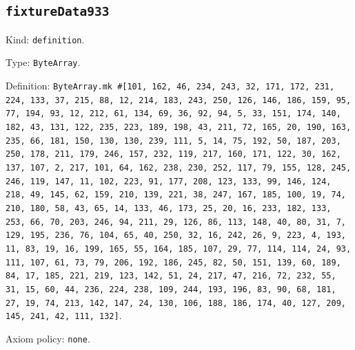\documentclass[11pt]{article}
\begin{document}
\subsection*{\texttt{fixtureData933}}
\noindent Kind: \texttt{definition}.\par
\noindent Type: \texttt{ByteArray}.\par
\noindent Definition: \texttt{ByteArray.mk \#[101, 162, 46, 234, 243, 32, 171, 172, 231, 224, 133, 37, 215, 88, 12, 214, 183, 243, 250, 126, 146, 186, 159, 95, 77, 194, 93, 12, 212, 61, 134, 69, 36, 92, 94, 5, 33, 151, 174, 140, 182, 43, 131, 122, 235, 223, 189, 198, 43, 211, 72, 165, 20, 190, 163, 235, 66, 181, 150, 130, 130, 239, 111, 5, 14, 75, 192, 50, 187, 203, 250, 178, 211, 179, 246, 157, 232, 119, 217, 160, 171, 122, 30, 162, 137, 107, 2, 217, 101, 64, 162, 238, 230, 252, 117, 79, 155, 128, 245, 246, 119, 147, 11, 102, 223, 91, 177, 208, 123, 133, 99, 146, 124, 218, 49, 145, 62, 159, 210, 139, 221, 38, 247, 167, 185, 100, 19, 74, 210, 180, 58, 43, 65, 14, 133, 46, 173, 25, 20, 16, 233, 182, 133, 253, 66, 70, 203, 246, 94, 211, 29, 126, 86, 113, 148, 40, 80, 31, 7, 129, 195, 236, 76, 104, 65, 40, 250, 32, 16, 242, 26, 9, 223, 4, 193, 11, 83, 19, 16, 199, 165, 55, 164, 185, 107, 29, 77, 114, 114, 24, 93, 111, 107, 61, 73, 79, 206, 192, 186, 245, 82, 50, 151, 139, 60, 189, 84, 17, 185, 221, 219, 123, 142, 51, 24, 217, 47, 216, 72, 232, 55, 31, 15, 60, 44, 236, 224, 238, 109, 244, 193, 196, 83, 90, 68, 181, 27, 19, 74, 213, 142, 147, 24, 130, 106, 188, 186, 174, 40, 127, 209, 145, 241, 42, 111, 132]}.\par
\noindent Axiom policy: \texttt{none}.\par
\end{document}
